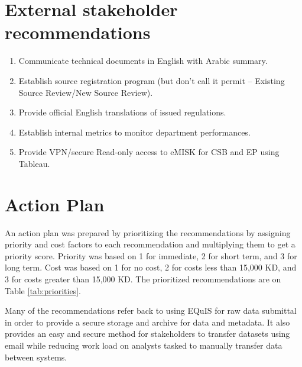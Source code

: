 \section{External stakeholder recommendations}
\begin{enumerate}
\item Communicate technical documents in English with Arabic summary.
\item Establish source registration program (but don’t call it permit – Existing Source Review/New Source Review).
\item Provide official English translations of issued regulations.
\item Establish internal metrics to monitor department performances.
\item Provide VPN/secure Read-only access to eMISK for CSB and EP using Tableau.
\end{enumerate}

\section{Action Plan}

An action plan was prepared by prioritizing the recommendations by assigning priority and cost factors to each recommendation and multiplying them to get a priority score. Priority was based on 1 for immediate, 2 for short term, and 3 for long term. Cost was based on 1 for no cost, 2 for costs less than 15,000 KD, and 3 for costs greater than 15,000 KD. The prioritized recommendations are on Table \ref{tab:priorities}.

Many of the recommendations refer back to using EQuIS for raw data submittal in order to provide a secure storage and archive for data and metadata. It also provides an easy and secure method for stakeholders to transfer datasets using email while reducing work load on analysts tasked to manually transfer data between systems.

